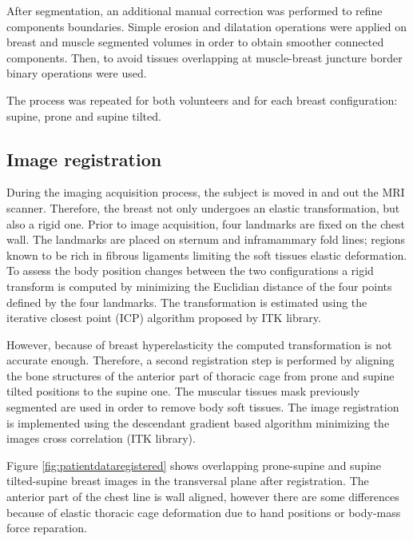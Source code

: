  After segmentation, an additional manual correction was performed to refine components boundaries. Simple erosion and dilatation operations were applied on breast and muscle segmented volumes in order to obtain smoother connected components. Then, to avoid tissues overlapping at muscle-breast juncture border binary operations were used.
 
The process was repeated for both volunteers and for each breast configuration: supine, prone and supine tilted.

\subsection{Image registration}\label{subsection:image registration}

During the imaging acquisition process, the subject is moved in and out the MRI scanner. Therefore, the breast not only undergoes an elastic transformation, but also a rigid one. Prior to image acquisition, four landmarks are fixed on the chest wall.  The landmarks are placed on sternum and inframammary fold lines; regions known to be rich in fibrous ligaments limiting the soft tissues elastic deformation.  To assess the body position changes between the two configurations a rigid transform is computed by minimizing the Euclidian distance of the four points defined by the four landmarks. The transformation is estimated using the iterative closest point (ICP) algorithm proposed by ITK library.

However, because of breast hyperelasticity the computed transformation is not accurate enough. Therefore, a second registration step is performed by aligning the bone structures of the anterior part of thoracic cage from prone and supine tilted positions to the supine one. The muscular tissues mask previously segmented are used in order to remove body soft tissues. The image registration is implemented using the descendant gradient based algorithm minimizing the images cross correlation (ITK library).

Figure \ref{fig:patientdataregistered} shows overlapping  prone-supine and supine tilted-supine breast images in the transversal plane after registration. The anterior part of the chest line is wall aligned, however there are some differences because of elastic thoracic cage deformation due to hand positions or body-mass force reparation. 

